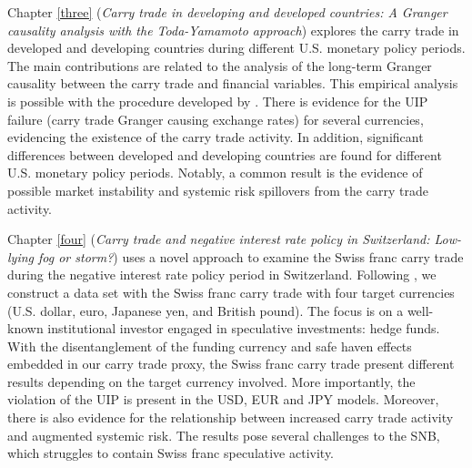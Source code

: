 \documentclass[a4paper, twoside]{templates/ociamthesis}
\begin{document}
Chapter \ref{three} (\emph{Carry trade in developing and developed countries: A Granger causality analysis with the Toda-Yamamoto approach}) explores the carry trade in developed and developing countries during different U.S. monetary policy periods. The main contributions are related to the analysis of the long-term Granger causality between the carry trade and financial variables. This empirical analysis is possible with the procedure developed by \textcite{toda1995}. There is evidence for the UIP failure (carry trade Granger causing exchange rates) for several currencies, evidencing the existence of the carry trade activity. In addition, significant differences between developed and developing countries are found for different U.S. monetary policy periods. Notably, a common result is the evidence of possible market instability and systemic risk spillovers from the carry trade activity.

Chapter \ref{four} (\emph{Carry trade and negative interest rate policy in Switzerland: Low-lying fog or storm?}) uses a novel approach to examine the Swiss franc carry trade during the negative interest rate policy period in Switzerland. Following \textcite{fong2013}, we construct a data set with the Swiss franc carry trade with four target currencies (U.S. dollar, euro, Japanese yen, and British pound). The focus is on a well-known institutional investor engaged in speculative investments: hedge funds. With the disentanglement of the funding currency and safe haven effects embedded in our carry trade proxy, the Swiss franc carry trade present different results depending on the target currency involved. More importantly, the violation of the UIP is present in the USD, EUR and JPY models. Moreover, there is also evidence for the relationship between increased carry trade activity and augmented systemic risk. The results pose several challenges to the SNB, which struggles to contain Swiss franc speculative activity.
\end{document}
